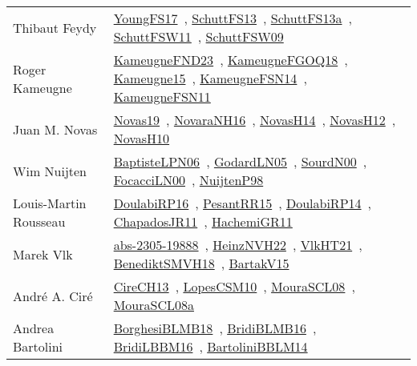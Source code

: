 {\begin{longtable}{p{4cm}p{20cm}}
Thibaut Feydy & \href{works/YoungFS17.pdf}{YoungFS17}~\cite{YoungFS17}, \href{works/SchuttFS13.pdf}{SchuttFS13}~\cite{SchuttFS13}, \href{works/SchuttFS13a.pdf}{SchuttFS13a}~\cite{SchuttFS13a}, \href{works/SchuttFSW11.pdf}{SchuttFSW11}~\cite{SchuttFSW11}, \href{works/SchuttFSW09.pdf}{SchuttFSW09}~\cite{SchuttFSW09}\\
Roger Kameugne & \href{works/KameugneFND23.pdf}{KameugneFND23}~\cite{KameugneFND23}, \href{works/KameugneFGOQ18.pdf}{KameugneFGOQ18}~\cite{KameugneFGOQ18}, \href{works/Kameugne15.pdf}{Kameugne15}~\cite{Kameugne15}, \href{works/KameugneFSN14.pdf}{KameugneFSN14}~\cite{KameugneFSN14}, \href{works/KameugneFSN11.pdf}{KameugneFSN11}~\cite{KameugneFSN11}\\
Juan M. Novas & \href{works/Novas19.pdf}{Novas19}~\cite{Novas19}, \href{works/NovaraNH16.pdf}{NovaraNH16}~\cite{NovaraNH16}, \href{works/NovasH14.pdf}{NovasH14}~\cite{NovasH14}, \href{works/NovasH12.pdf}{NovasH12}~\cite{NovasH12}, \href{works/NovasH10.pdf}{NovasH10}~\cite{NovasH10}\\
Wim Nuijten & \href{}{BaptisteLPN06}~\cite{BaptisteLPN06}, \href{}{GodardLN05}~\cite{GodardLN05}, \href{}{SourdN00}~\cite{SourdN00}, \href{works/FocacciLN00.pdf}{FocacciLN00}~\cite{FocacciLN00}, \href{works/NuijtenP98.pdf}{NuijtenP98}~\cite{NuijtenP98}\\
Louis{-}Martin Rousseau & \href{}{DoulabiRP16}~\cite{DoulabiRP16}, \href{works/PesantRR15.pdf}{PesantRR15}~\cite{PesantRR15}, \href{works/DoulabiRP14.pdf}{DoulabiRP14}~\cite{DoulabiRP14}, \href{works/ChapadosJR11.pdf}{ChapadosJR11}~\cite{ChapadosJR11}, \href{works/HachemiGR11.pdf}{HachemiGR11}~\cite{HachemiGR11}\\
Marek Vlk & \href{works/abs-2305-19888.pdf}{abs-2305-19888}~\cite{abs-2305-19888}, \href{works/HeinzNVH22.pdf}{HeinzNVH22}~\cite{HeinzNVH22}, \href{works/VlkHT21.pdf}{VlkHT21}~\cite{VlkHT21}, \href{works/BenediktSMVH18.pdf}{BenediktSMVH18}~\cite{BenediktSMVH18}, \href{}{BartakV15}~\cite{BartakV15}\\
Andr{\'{e}} A. Cir{\'{e}} & \href{works/CireCH13.pdf}{CireCH13}~\cite{CireCH13}, \href{works/LopesCSM10.pdf}{LopesCSM10}~\cite{LopesCSM10}, \href{works/MouraSCL08.pdf}{MouraSCL08}~\cite{MouraSCL08}, \href{works/MouraSCL08a.pdf}{MouraSCL08a}~\cite{MouraSCL08a}\\
Andrea Bartolini & \href{works/BorghesiBLMB18.pdf}{BorghesiBLMB18}~\cite{BorghesiBLMB18}, \href{works/BridiBLMB16.pdf}{BridiBLMB16}~\cite{BridiBLMB16}, \href{works/BridiLBBM16.pdf}{BridiLBBM16}~\cite{BridiLBBM16}, \href{works/BartoliniBBLM14.pdf}{BartoliniBBLM14}~\cite{BartoliniBBLM14}\\

\end{longtable}}

